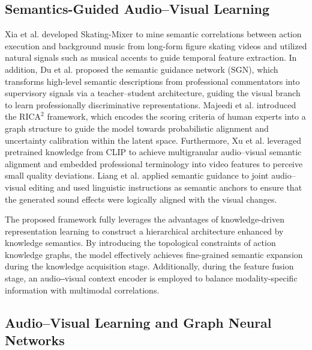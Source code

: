 \documentclass[lettersize,journal]{IEEEtran}
\begin{document}
\subsection{Semantics-Guided Audio–Visual Learning}

Xia et al.\cite{17} developed Skating-Mixer to mine semantic correlations between action execution and background music from long-form figure skating videos and utilized natural signals such as musical accents to guide temporal feature extraction\cite{18}. In addition, Du et al.\cite{19} proposed the semantic guidance network (SGN), which transforms high-level semantic descriptions from professional commentators into supervisory signals via a teacher–student architecture, guiding the visual branch to learn professionally discriminative representations. Majeedi et al.\cite{20} introduced the $\text{RICA}^2$ framework, which encodes the scoring criteria of human experts into a graph structure to guide the model towards probabilistic alignment and uncertainty calibration within the latent space. Furthermore, Xu et al.\cite{21} leveraged pretrained knowledge from CLIP to achieve multigranular audio–visual semantic alignment and embedded professional terminology into video features to perceive small quality deviations\cite{22}. Liang et al.\cite{23} applied semantic guidance to joint audio–visual editing and used linguistic instructions as semantic anchors to ensure that the generated sound effects were logically aligned with the visual changes.


The proposed framework fully leverages the advantages of knowledge-driven representation learning to construct a hierarchical architecture enhanced by knowledge semantics. By introducing the topological constraints of action knowledge graphs, the model effectively achieves fine-grained semantic expansion during the knowledge acquisition stage. Additionally, during the feature fusion stage, an audio‒visual context encoder is employed to balance modality-specific information with multimodal correlations.

\subsection{Audio–Visual Learning and Graph Neural Networks}
\end{document}
